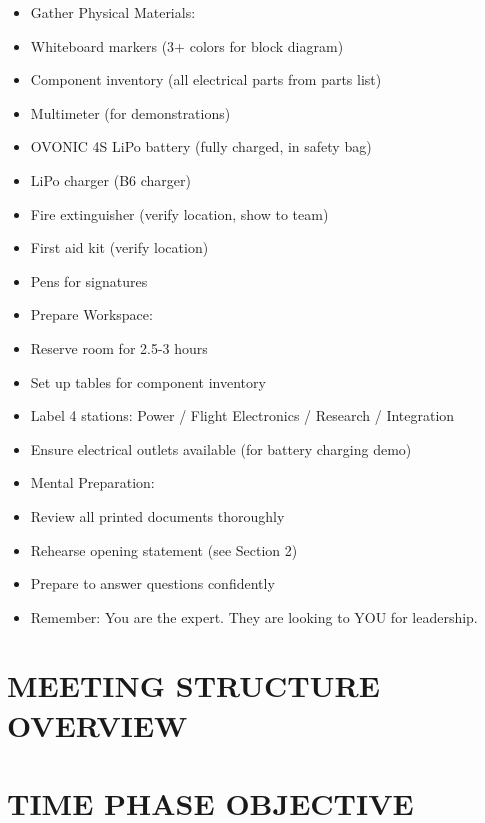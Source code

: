 \documentclass[11pt,letterpaper]{article}
\begin{document}
\begin{itemize}
  \item Gather Physical Materials:
  \item Whiteboard markers (3+ colors for block diagram)
  \item Component inventory (all electrical parts from parts list)
  \item Multimeter (for demonstrations)
  \item OVONIC 4S LiPo battery (fully charged, in safety bag)
  \item LiPo charger (B6 charger)
  \item Fire extinguisher (verify location, show to team)
  \item First aid kit (verify location)
  \item Pens for signatures
\end{itemize}

\begin{itemize}
  \item Prepare Workspace:
  \item Reserve room for 2.5-3 hours
  \item Set up tables for component inventory
  \item Label 4 stations: Power / Flight Electronics / Research / Integration
  \item Ensure electrical outlets available (for battery charging demo)
\end{itemize}

\begin{itemize}
  \item Mental Preparation:
  \item Review all printed documents thoroughly
  \item Rehearse opening statement (see Section 2)
  \item Prepare to answer questions confidently
  \item Remember: You are the expert. They are looking to YOU for leadership.
\end{itemize}

\section{MEETING STRUCTURE OVERVIEW}

\section{TIME    PHASE                           OBJECTIVE}
\end{document}
